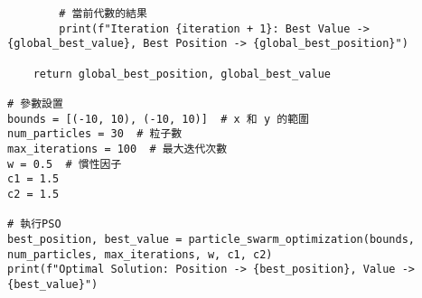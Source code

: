 \begin{verbatim}
        # 當前代數的結果
        print(f"Iteration {iteration + 1}: Best Value -> {global_best_value}, Best Position -> {global_best_position}")

    return global_best_position, global_best_value

# 參數設置
bounds = [(-10, 10), (-10, 10)]  # x 和 y 的範圍
num_particles = 30  # 粒子數
max_iterations = 100  # 最大迭代次數
w = 0.5  # 慣性因子
c1 = 1.5  
c2 = 1.5  

# 執行PSO
best_position, best_value = particle_swarm_optimization(bounds, num_particles, max_iterations, w, c1, c2)
print(f"Optimal Solution: Position -> {best_position}, Value -> {best_value}")
\end{verbatim}